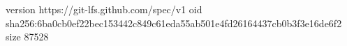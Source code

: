 version https://git-lfs.github.com/spec/v1
oid sha256:6ba0cb0ef22bec153442c849c61eda55ab501e4fd26164437cb0b3f3e16de6f2
size 87528
